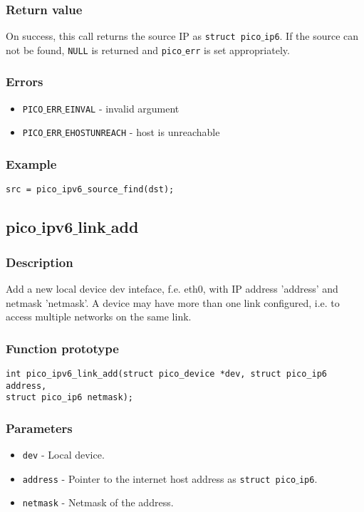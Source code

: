 \subsubsection*{Return value}
On success, this call returns the source IP as \texttt{struct pico$\_$ip6}.
If the source can not be found, \texttt{NULL} is returned and \texttt{pico$\_$err} is set appropriately.

\subsubsection*{Errors}
\begin{itemize}[noitemsep]
\item \texttt{PICO$\_$ERR$\_$EINVAL} - invalid argument
\item \texttt{PICO$\_$ERR$\_$EHOSTUNREACH} - host is unreachable
\end{itemize}

\subsubsection*{Example}
\begin{verbatim}
src = pico_ipv6_source_find(dst);
\end{verbatim}




\subsection{pico$\_$ipv6$\_$link$\_$add }

\subsubsection*{Description}
Add a new local device dev inteface, f.e. eth0, with IP address 'address' and netmask 'netmask'. A device may have more than one link configured, i.e. to access multiple networks on the same link.

\subsubsection*{Function prototype}
\begin{verbatim}
int pico_ipv6_link_add(struct pico_device *dev, struct pico_ip6 address,
struct pico_ip6 netmask);
\end{verbatim}

\subsubsection*{Parameters}
\begin{itemize}[noitemsep]
\item \texttt{dev} - Local device.
\item \texttt{address} - Pointer to the internet host address as \texttt{struct pico$\_$ip6}.
\item \texttt{netmask} - Netmask of the address.
\end{itemize}

